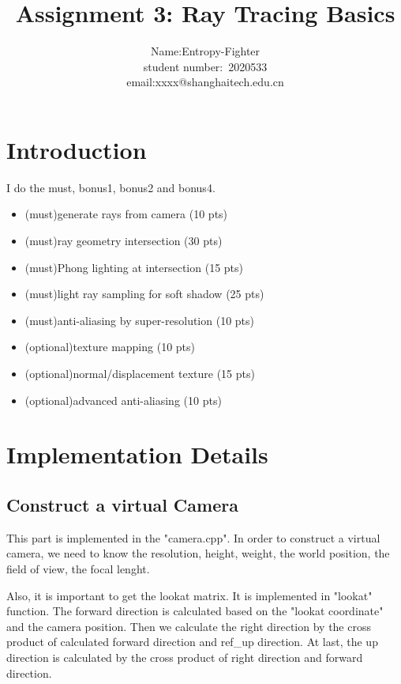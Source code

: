 \documentclass[acmtog]{acmart}
\title{Assignment 3: {Ray Tracing Basics}}
\author{Name:\quad Entropy-Fighter\\ student number:\ 2020533
\\email:\quad xxxx@shanghaitech.edu.cn}
\begin{document}
\maketitle

\vspace*{2 ex}

\section{Introduction}
\quad I do the must, bonus1, bonus2 and bonus4.
\begin{itemize}
\item (must)generate rays from camera (10 pts)
\item (must)ray geometry intersection (30 pts)
\item (must)Phong lighting at intersection (15 pts)
\item (must)light ray sampling for soft shadow (25 pts)
\item (must)anti-aliasing by super-resolution (10 pts)
\item (optional)texture mapping (10 pts)
\item (optional)normal/displacement texture (15 pts)
\item (optional)advanced anti-aliasing (10 pts)
\end{itemize}



\section{Implementation Details}

\subsection{Construct a virtual Camera}
\quad This part is implemented in the "camera.cpp".
In order to construct a virtual camera, we need to know the resolution, height, weight, the world position, the field of view, the focal lenght.

Also, it is important to get the lookat matrix. 
It is implemented in "lookat" function. The forward direction is calculated based on the "lookat coordinate" and the camera position. 
Then we calculate the right direction by the cross product of calculated forward direction and ref\_up direction. 
At last, the up direction is calculated by the cross product of right direction and forward direction.
\end{document}
